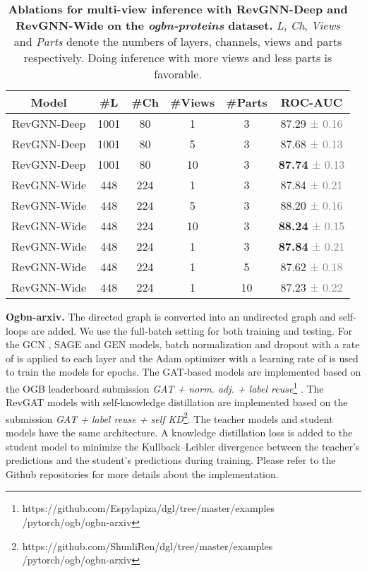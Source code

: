 \documentclass{article}
\newcommand{\mysection}[1]{\vspace{0pt}\noindent\textbf{#1.}}
\begin{document}
\begin{table}[t]
\centering
\setlength{\tabcolsep}{2pt}
\caption{\textbf{Ablations for multi-view inference with RevGNN-Deep and RevGNN-Wide on the \emph{ogbn-proteins} dataset.} \emph{L}, \emph{Ch}, \emph{Views} and \emph{Parts} denote the numbers of layers, channels, views and parts respectively. Doing inference with more views and less parts is favorable.}
\vspace{2pt}
\begin{tabular}{cccccc}
\toprule
  \label{table:multi_view}
  \centering
Model & \#L & \#Ch & \#Views & \#Parts & ROC-AUC  \\
\midrule
RevGNN-Deep & 1001 & 80 & 1 & 3 &
87.29 \textcolor{gray}{\small{± 0.16}}\\
RevGNN-Deep & 1001 & 80 & 5 & 3 &
87.68 \textcolor{gray}{\small{± 0.13}}\\
RevGNN-Deep & 1001 & 80 & 10 & 3 &
\textbf{87.74} \textcolor{gray}{\small{± 0.13}}\\
\midrule
RevGNN-Wide & 448 & 224 & 1 & 3
& 87.84 \textcolor{gray}{\small{± 0.21}}\\
RevGNN-Wide & 448 & 224 & 5 & 3
& 88.20 \textcolor{gray}{\small{± 0.16}}\\
RevGNN-Wide & 448 & 224 & 10 & 3
& \textbf{88.24} \textcolor{gray}{\small{± 0.15}}\\
\midrule
RevGNN-Wide & 448 & 224 & 1 & 3
& \textbf{87.84} \textcolor{gray}{\small{± 0.21}}\\
RevGNN-Wide & 448 & 224 & 1 & 5
& 87.62 \textcolor{gray}{\small{± 0.18}}\\
RevGNN-Wide & 448 & 224 & 1 & 10
& 87.23 \textcolor{gray}{\small{± 0.22}}\\
\bottomrule
\end{tabular}
\end{table}

\mysection{Ogbn-arxiv}
The directed graph is converted into an undirected graph and self-loops are added. We use the full-batch setting for both training and testing. For the GCN \citep{kipf2017semi}, SAGE \citep{hamilton2017inductive} and GEN \citep{li2020deepergcn} models, batch normalization and dropout with a rate of  is applied to each layer and the Adam optimizer with a learning rate of  is used to train the models for  epochs. The GAT-based \citep{veli2018gat} models are implemented based on the OGB leaderboard submission \emph{GAT + norm. adj. + label reuse}\footnote{\small{https://github.com/Espylapiza/dgl/tree/master/examples \\ /pytorch/ogb/ogbn-arxiv}} \citep{wang2021bag}. The RevGAT models with self-knowledge distillation are implemented based on the submission \emph{GAT + label reuse + self KD}\footnote{ https://github.com/ShunliRen/dgl/tree/master/examples \\
/pytorch/ogb/ogbn-arxiv}. The teacher models and student models have the same architecture. A knowledge distillation loss is added to the student model to minimize the Kullback–Leibler divergence between the teacher's predictions and the student's predictions during training. Please refer to the Github repositories for more details about the implementation.
\end{document}
